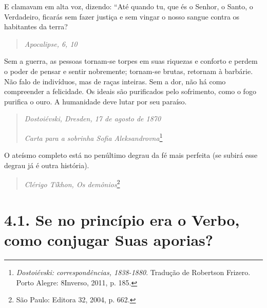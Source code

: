 


E clamavam em alta voz, dizendo: ``Até quando tu, que és o Senhor, o
Santo, o Verdadeiro, ficarás sem fazer justiça e sem vingar o nosso
sangue contra os habitantes da terra?

\begin{quote}
\emph{Apocalipse, 6, 10}
\end{quote}

Sem a guerra, as pessoas tornam-se torpes em suas riquezas e conforto e
perdem o poder de pensar e sentir nobremente; tornam-se brutas, retornam
à barbárie. Não falo de indivíduos, mas de raças inteiras. Sem a dor,
não há como compreender a felicidade. Os ideais são purificados pelo
sofrimento, como o fogo purifica o ouro. A humanidade deve lutar por seu
paraíso.

\begin{quote}
\emph{Dostoiévski, Dresden, 17 de agosto de 1870 }

\emph{Carta para a sobrinha Sofia Aleksandrovna}\footnote{\emph{Dostoiévski:
  correspondências, 1838-1880}. Tradução de Robertson Frizero. Porto
  Alegre: 8Inverso, 2011, p. 185.}
\end{quote}

O ateísmo completo está no penúltimo degrau da fé mais perfeita (se
subirá esse degrau já é outra história).

\begin{quote}
\emph{Clérigo Tíkhon, Os demônios}\footnote{São Paulo: Editora 32, 2004,
  p. 662.}
\end{quote}

\section{4.1. Se no princípio era o Verbo, como conjugar Suas aporias?}

